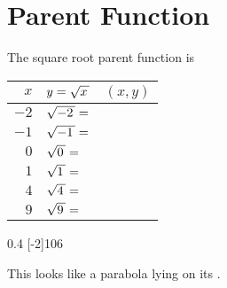 \section{Parent Function}

The square root parent function is 
\myCenteredBox[width=1.75in,valign=center]{
    \large
    \vspace{-1.2em}
    \[ f(x) = \myRoot{x} \]
}
%

\begin{minipage}{0.5\textwidth}
    \centering 
    \renewcommand{\arraystretch}{1.75}
    \begin{tabular}{r|p{1.25in}|c}
        $x$ 
            & $y = \myRoot{x}$    
            & $(x,y)$\\ \hline\hline
        $-2$ 
            & $\myRoot{-2} = $  
            & \phantom{$(-9,9)$}\\ \hline
        $-1$ 
            & $\myRoot{-1} = $  
            & \\ \hline
        $0$ 
            & $\myRoot{0} = $    
            & \\ \hline
        $1$ 
            & $\myRoot{1} = $    
            & \\ \hline
        $4$ 
            & $\myRoot{4} = $    
            & \\ \hline
        $9$ 
            & $\myRoot{9} = $    
            & \\ \hline
    \end{tabular}
\end{minipage}
\begin{minipage}{0.5\textwidth}
    \centering
    \begin{myTikzpictureGrid}{0.4} [-2]{10}{6}
    \end{myTikzpictureGrid}
\end{minipage}

This looks like  a parabola lying on its .

